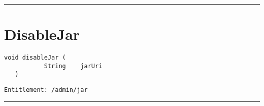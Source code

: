 \rule{12cm}{2pt}
\section{DisableJar}
\label{Api:DisableJar}
\begin{lstlisting}[style=nonumbers]
   void disableJar (
           String    jarUri
   )
\end{lstlisting}
\begin{Verbatim}[formatcom=\color{Maroon}]
  Entitlement: /admin/jar
\end{Verbatim}



\rule{12cm}{2pt}
